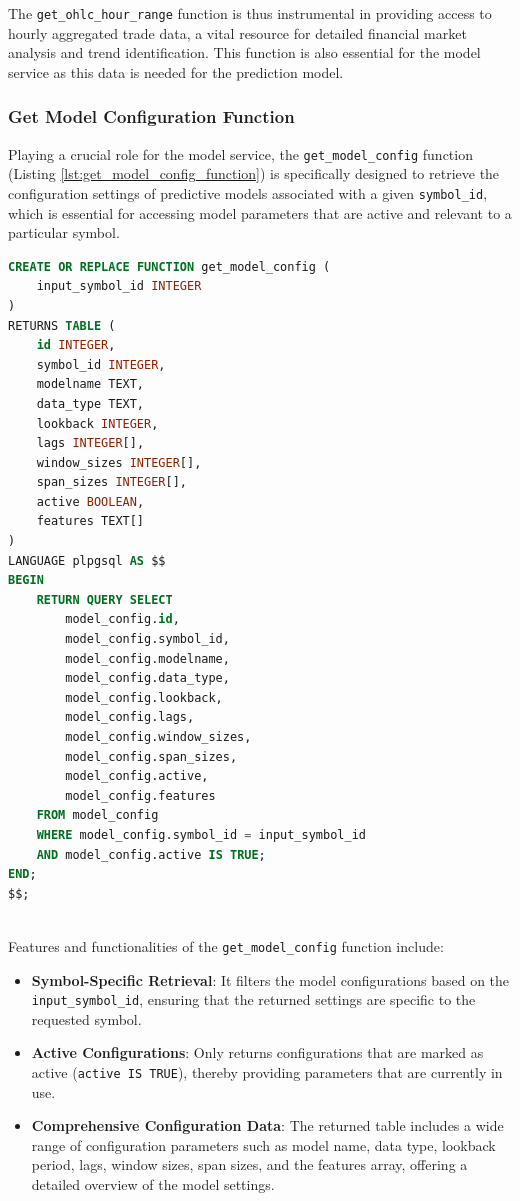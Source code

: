 The \texttt{get\_ohlc\_hour\_range} function is thus instrumental in providing access to hourly aggregated trade data, a vital resource for detailed financial market analysis and trend identification. This function is also essential for the model service as this data is needed for the prediction model.

\subsubsection{Get Model Configuration Function}
Playing a crucial role for the model service, the \texttt{get\_model\_config} function (Listing \ref{lst:get_model_config_function}) is specifically designed to retrieve the configuration settings of predictive models associated with a given \texttt{symbol\_id}, which is essential for accessing model parameters that are active and relevant to a particular symbol. 
\begin{lstlisting}[language=SQL, caption={Function for Retrieving Model Configuration}, label={lst:get_model_config_function}]
CREATE OR REPLACE FUNCTION get_model_config (
    input_symbol_id INTEGER 
)
RETURNS TABLE (
    id INTEGER,
    symbol_id INTEGER,
    modelname TEXT,
    data_type TEXT,
    lookback INTEGER,
    lags INTEGER[],
    window_sizes INTEGER[],
    span_sizes INTEGER[],
    active BOOLEAN,
    features TEXT[]
)
LANGUAGE plpgsql AS $$
BEGIN
    RETURN QUERY SELECT 
        model_config.id,
        model_config.symbol_id,
        model_config.modelname,
        model_config.data_type,
        model_config.lookback,
        model_config.lags,
        model_config.window_sizes,
        model_config.span_sizes,
        model_config.active,
        model_config.features
    FROM model_config
    WHERE model_config.symbol_id = input_symbol_id 
    AND model_config.active IS TRUE;
END;
$$;
\end{lstlisting}
\mbox{} \\
Features and functionalities of the \texttt{get\_model\_config} function include:
\begin{itemize}
    \item \textbf{Symbol-Specific Retrieval}: It filters the model configurations based on the \texttt{input\_symbol\_id}, ensuring that the returned settings are specific to the requested symbol.
    \item \textbf{Active Configurations}: Only returns configurations that are marked as active (\texttt{active IS TRUE}), thereby providing parameters that are currently in use.
    \item \textbf{Comprehensive Configuration Data}: The returned table includes a wide range of configuration parameters such as model name, data type, lookback period, lags, window sizes, span sizes, and the features array, offering a detailed overview of the model settings.
\end{itemize}

